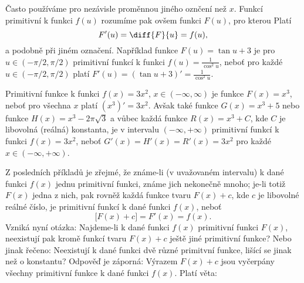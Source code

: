     Často používáme pro nezávisle proměnnou jiného oznčení než \(x\). Funkcí primitivní k funkci
    \(f(u)\) rozumíme pak ovšem funkci \(F(u)\), pro kterou Platí
    \begin{equation*}
      F'(u) = \diff{F}{u} = f(u),
    \end{equation*}
    a podobně při jiném označení. Například funkce \(F(u) = \tan u + 3\) je pro \(u\in(-\pi/2,
    \pi/2)\) primitivní funkcí k funkci \(f(u)=\frac{1}{\cos^2u}\), neboť pro každé \(u\in(-\pi/2,
    \pi/2)\) platí \(F'(u)=(\tan u + 3)' = \frac{1}{\cos^2u}\).

    Primitivní funkce k funkci \(f(x)=3x^2\), \(x\in(-\infty, \infty)\) je funkce \(F(x)=x^3\),
    neboť pro všechna \(x\) platí \((x^3)'=3x^2\). Avšak také funkce \(G(x) = x^3+5\) nebo funkce
    \(H(x)=x^3-2\pi\sqrt{3}\) a vůbec každá funkce \(R(x)=x^3+C\), kde \(C\) je libovolná (reálná)
    konstanta, je v intervalu \((-\infty, +\infty)\) primitivní funkcí k funkci \(f(x)=3x^2\), neboť
    \(G'(x)=H'(x)=R'(x)=3x^2\) pro každé \(x\in(-\infty, +\infty)\). 

    Z posledních příkladů je zřejmé, že známe-li (v uvažovaném intervalu) k dané funkci \(f(x)\)
    jednu primitivní funkci, známe jich nekonečně mnoho; je-li totiž \(F(x)\) jedna z nich, pak
    rovněž každá funkce tvaru \(F(x)+c\), kde \(c\) je libovolné reálné číslo, je primitivní funkcí
    k dané funkci \(f(x)\), neboť
    \begin{equation*}
      \bigl[F(x) + c\bigl] = F'(x) = f(x).
    \end{equation*}
    Vzniká nyní otázka: Najdeme-li k dané funkci \(f(x)\) primitivní funkci \(F(x)\), neexistují pak
    kromě funkcí tvaru \(F(x) + c\) ještě jiné primitivní funkce? Nebo jinak řečeno: Neexistují k
    dané funkci dvě různé primitvní funkce, lišící se jinak než o konstantu? Odpověď je záporná:
    Výrazem \(F(x) + c\) jsou vyčerpány všechny primitivní funkce k dané funkci \(f(x)\). Platí
    věta: 

